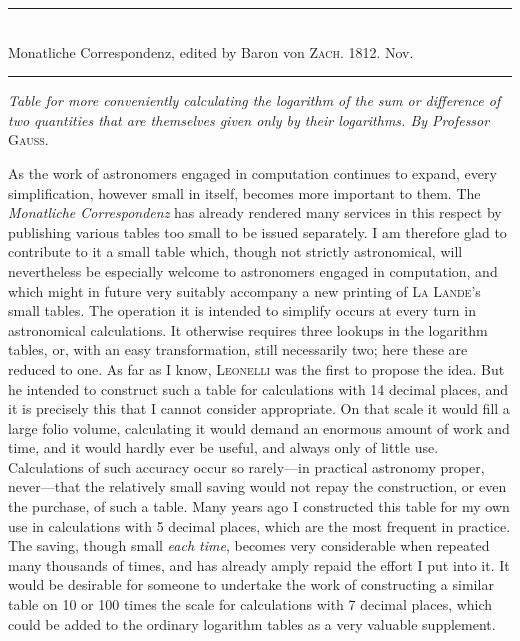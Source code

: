 \par{}
\begin{center}
\rule{0.66\linewidth}{0.3pt}\\
Monatliche Correspondenz, edited by Baron von \textsc{Zach}. 1812. Nov.\\
\rule{0.66\linewidth}{0.3pt}
\end{center}

\emph{Table for more conveniently calculating the logarithm of the sum or difference of two quantities that are themselves given only by their logarithms. By Professor} \textsc{Gauss}.

As the work of astronomers engaged in computation continues to expand, every simplification, however small in itself, becomes more important to them. The \emph{Monatliche Correspondenz} has already rendered many services in this respect by publishing various tables too small to be issued separately. I am therefore glad to contribute to it a small table which, though not strictly astronomical, will nevertheless be especially welcome to astronomers engaged in computation, and which might in future very suitably accompany a new printing of \textsc{La
Lande}'s small tables. The operation it is intended to simplify occurs at every turn in astronomical calculations. It otherwise requires three lookups in the logarithm tables, or, with an easy transformation, still necessarily two; here these are reduced to one. As far as I know, \textsc{Leonelli} was the first to propose the idea. But he intended to construct such a table for calculations with 14 decimal places, and it is precisely this that I cannot consider appropriate. On that scale it would fill a large folio volume, calculating it would demand an enormous amount of work and time, and it would hardly ever be useful, and always only of little use. Calculations of such accuracy occur so rarely---in practical astronomy proper, never---that the relatively small saving would not repay the construction, or even the purchase, of such a table. Many years ago I constructed this table for my own use in calculations with 5 decimal places, which are the most frequent in practice. The saving, though small \emph{each time}, becomes very considerable when repeated many thousands of times, and has already amply repaid the effort I put into it. It would be desirable for someone to undertake the work of constructing a similar table on 10 or 100 times the scale for calculations with 7 decimal places, 
which could be added to the ordinary logarithm tables as a very valuable supplement.


